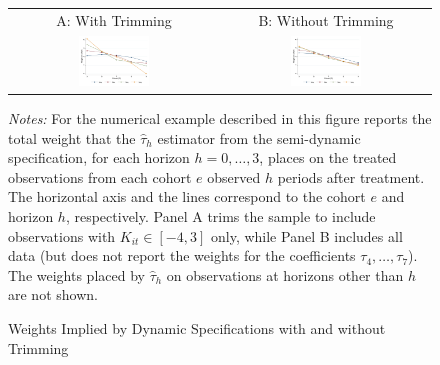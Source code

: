 \documentclass[english,11pt]{article}
\providecommand{\tabularnewline}{\\}
\theoremstyle{plain}
\theoremstyle{plain}
\theoremstyle{plain}
\theoremstyle{plain}
\let\ref\Cref
\begin{document}
\begin{figure}[H]
\caption{Weights Implied by Dynamic Specifications with and without Trimming\label{fig:Trimming}}

\vspace{4mm}
\begin{centering}
\begin{tabular}{cc}
{\small{}A: With Trimming} & {\small{}B: Without Trimming}\tabularnewline
\includegraphics[width=0.35\textwidth]{Graphs/FigureA1_A} & \includegraphics[width=0.35\textwidth]{Graphs/FigureA1_B}\tabularnewline
\end{tabular}
\par\end{centering}
\emph{\small{}Notes:}{\small{} For the numerical example described
in \ref{subsec:Trimming} this figure reports the total weight that
the $\hat{\tau}_{h}$ estimator from the semi-dynamic specification,
for each horizon $h=0,\dots,3$, places on the treated observations
from each cohort $e$ observed $h$ periods after treatment. The horizontal
axis and the lines correspond to the cohort $e$ and horizon $h$,
respectively. Panel A trims the sample to include observations with
$K_{it}\in[-4,3]$ only, while Panel B includes all data (but does
not report the weights for the coefficients $\tau_{4},\dots,\tau_{7}$).
The weights placed by $\hat{\tau}_{h}$ on observations at horizons
other than $h$ are not shown.}{\small\par}
\end{figure}
\end{document}
